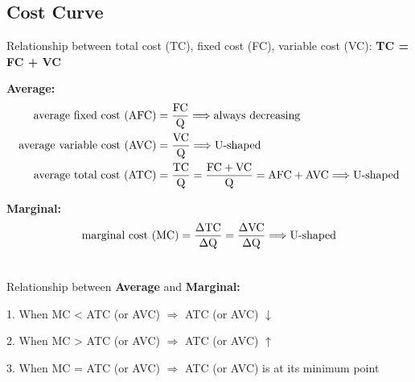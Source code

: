 \documentclass[UTF8]{article}
\begin{document}
\subsection{Cost Curve}

Relationship between total cost (TC), fixed cost (FC), variable cost (VC): \textbf{TC = FC + VC}

\begin{figure}[!h]
    \centering
{}    
\end{figure}

\textbf{Average:}
\begin{equation}
\begin{aligned}
    \text{average fixed cost (AFC)} &= {\text{FC}\over \text{Q}} \Longrightarrow \text{always decreasing}\\
    \text{average variable cost (AVC)} &= {\text{VC}\over \text{Q}} \Longrightarrow \text{U-shaped}\\
    \text{average total cost (ATC)} &= {\text{TC}\over \text{Q}} = {\text{FC}+\text{VC}\over \text{Q}} = \text{AFC} + \text{AVC} \Longrightarrow \text{U-shaped}
    \nonumber
\end{aligned}
\end{equation}

\textbf{Marginal:}
\begin{equation}
\begin{aligned}
    \text{marginal cost (MC)} &= {\Delta \text{TC} \over \Delta \text{Q}} = {\Delta \text{VC} \over \Delta \text{Q}} \Longrightarrow \text{U-shaped}\\
    \nonumber
\end{aligned}
\end{equation}

Relationship between \textbf{Average} and \textbf{Marginal:} 

1. When MC < ATC (or AVC) $\Longrightarrow$ ATC (or AVC) $\downarrow$

2. When MC > ATC (or AVC) $\Longrightarrow$ ATC (or AVC) $\uparrow$

3. When MC = ATC (or AVC) $\Longrightarrow$ ATC (or AVC) is at its minimum point
\end{document}
